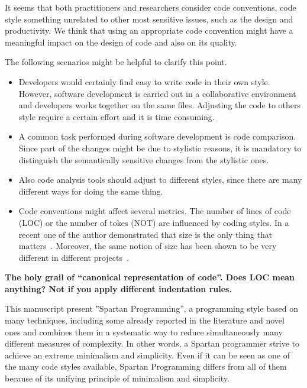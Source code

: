 It seems that both practitioners and researchers consider code conventions, code style
something unrelated to other most sensitive issues, such as the design and productivity.
We think that using an appropriate code convention might have a meaningful impact on the
design of code and also on its quality.

The following scenarios might be helpful to clarify this point.
\begin{itemize}
    \item Developers would certainly find easy to write code in their own style. However, software
    development is carried out in a collaborative environment and developers works together on
    the same files. Adjusting the code to others style require a certain effort and it is time consuming.
    \item A common task performed during software development is code comparison.
    Since part of the changes might be due to stylistic reasons, it is mandatory to distinguish the
    semantically sensitive changes from the stylistic ones.
    \item Also code analysis tools should adjust to different styles, since there are many
        different ways for doing the same thing.
    \item Code conventions might affect several metrics. The number of lines of code (LOC) or the number of
    tokes (NOT) are influenced by coding styles. In a recent one of the author demonstrated that size
      is the only thing that matters~\cite{Gil:Lalouche:16}.
      Moreover, the same notion of size has been shown to be very different in different projects~\cite{Gil:Lalouche:16}.
\end{itemize}

\textbf{The holy grail of ``canonical representation of code''.  
  Does LOC mean anything?  Not if you apply different indentation 
rules.}

This manuscript present ‟Spartan Programming”, a programming style based on
many techniques, including some already reported in the literature and novel
ones and combines them in a systematic way to reduce simultaneously many
different measures of complexity. In other words, a Spartan programmer strive
to achieve an extreme minimalism and simplicity. Even if it can be seen as one
of the many code styles available, Spartan Programming differs from all of them
because of its unifying principle of minimalism and simplicity.

